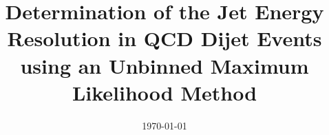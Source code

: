 \documentclass[a4paper]{cmspaper} %
\begin{document}
\begin{titlepage}
  \date{\today}
  \title{Determination of the Jet Energy Resolution in QCD Dijet
    Events using an Unbinned Maximum Likelihood Method}
\end{titlepage}
\tableofcontents












\end{document}
